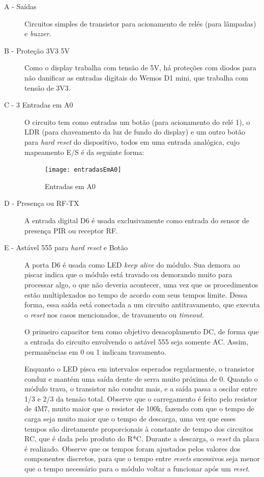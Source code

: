 \begin{description}
\item [A - Saídas] Circuitos simples de transistor para acionamento de relés (para lâmpadas) e \emph{buzzer}.
\item [B - Proteção 3V3 5V] Como o display trabalha com tensão de 5V, há proteções com diodos para não danificar as entradas digitais do Wemos D1 mini, que trabalha com tensão de 3V3.
\item [C - 3 Entradas em A0] O circuito tem como entradas um botão (para acionamento do relé 1), o LDR (para chaveamento da luz de fundo do display) e um outro botão para \emph{hard reset} do dispositivo, todos em uma entrada analógica, cujo mapeamento E/S é da seguinte forma:

\begin{figure}[H]
	\centering
	\caption{Entradas em A0}
  \texttt{[image: entradasEmA0]}
\label{fig:entradasEmA0}
\end{figure}

\item [D - Presença ou RF-TX] A entrada digital D6 é usada exclusivamente como entrada do sensor de presença PIR ou receptor RF.
\item [E - Astável 555 para \emph{hard reset} e Botão] A porta D6 é usada como LED \textit{keep alive} do módulo. Sua demora ao piscar indica que o módulo está travado ou demorando muito para processar algo, o que não deveria acontecer, uma vez que os procedimentos estão multiplexados no tempo de acordo com seus tempos limite. Dessa forma, essa saída está conectada a um circuito antitravamento, que executa o \emph{reset} nos casos mencionados, de travamento ou \textit{timeout}.

O primeiro capacitor tem como objetivo desacoplamento DC, de forma que a entrada do circuito envolvendo o astável 555 seja somente AC. Assim, permanências em 0 ou 1 indicam travamento.

Enquanto o LED pisca em intervalos esperados regularmente, o transistor conduz e mantém uma saída dente de serra muito próxima de 0. Quando o módulo trava, o transistor não conduz mais, e a saída passa a oscilar entre 1/3 e 2/3 da tensão total. Observe que o carregamento é feito pelo resistor de 4M7, muito maior que o resistor de 100k, fazendo com que o tempo de carga seja muito maior que o tempo de descarga, uma vez que esses tempos são diretamente proporcionais à constante de tempo dos circuitos RC, que é dada pelo produto do R*C. Durante a descarga, o \emph{reset} da placa é realizado. Observe que os tempos foram ajustados pelos valores dos componentes discretos, para que o tempo entre \emph{resets} sucessivos seja menor que o tempo necessário para o módulo voltar a funcionar após um \emph{reset}.


\end{description}
